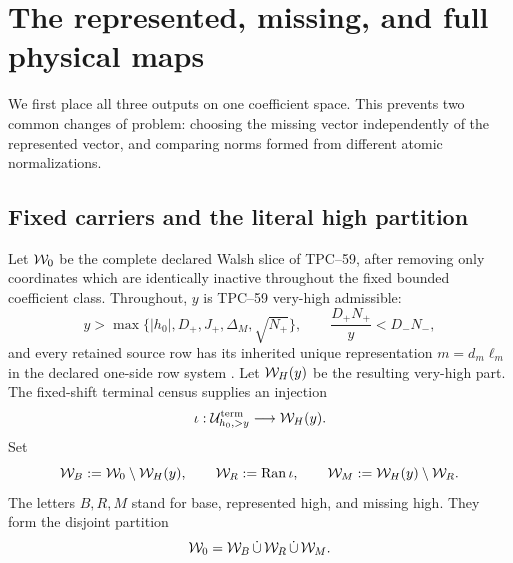 \section{The represented, missing, and full physical maps}
\label{sec:tpc60-physical-interface}

We first place all three outputs on one coefficient space.  This prevents
two common changes of problem: choosing the missing vector independently
of the represented vector, and comparing norms formed from different
atomic normalizations.

\subsection{Fixed carriers and the literal high partition}

Let \(\mathcal W_0\) be the complete declared Walsh slice of TPC--59, after
removing only coordinates which are identically inactive throughout the
fixed bounded coefficient class.  Throughout, \(y\) is TPC--59
very-high admissible:
\begin{equation}
 y>\max\{|h_0|,D_+,J_+,\Delta_M,\sqrt{N_+}\},
 \qquad
 \frac{D_+N_+}{y}<D_-N_-,
 \label{eq:tpc60-very-high-admissibility}
\end{equation}
and every retained source row has its inherited unique representation
\(m=d_m\ell_m\) in the declared one-side row system
\citep{WangTPC59}.  Let \(\mathcal W_H(y)\) be the resulting very-high part.
The fixed-shift terminal census supplies an injection
\begin{equation}
 \iota:\mathcal U_{h_0,>y}^{\rm term}\longrightarrow\mathcal W_H(y).
 \label{eq:tpc60-terminal-Walsh-injection}
\end{equation}
Set
\begin{equation}
 \mathcal W_B:=\mathcal W_0\setminus\mathcal W_H(y),
 \qquad
 \mathcal W_R:=\operatorname{Ran}\iota,
 \qquad
 \mathcal W_M:=\mathcal W_H(y)\setminus\mathcal W_R.
 \label{eq:tpc60-BRM-carriers}
\end{equation}
The letters \(B,R,M\) stand for base, represented high, and missing high.
They form the disjoint partition
\begin{equation}
 \mathcal W_0=\mathcal W_B\,\dot\cup\,\mathcal W_R\,\dot\cup\,\mathcal W_M.
 \label{eq:tpc60-W0-partition}
\end{equation}

